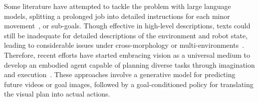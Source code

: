 %
Some literature
have attempted to tackle the problem with large language models, splitting a prolonged job into detailed instructions for each minor movement~\citep{}, or sub-goals.
%
Though effective in high-level descriptions, texts could still be inadequate for detailed descriptions of the environment and robot state, leading to considerable issues under cross-morphology or multi-environments~\citep{du2024learning}.
Therefore, 
recent efforts have started embracing vision as a universal medium
to develop an embodied agent capable of planning diverse tasks through imagination and execution~\citep{black2023zero, du2024learning, Yang2023LearningIR}. These approaches involve a generative model for predicting future videos or goal images, followed by a goal-conditioned policy for translating the visual plan into actual actions. 
%











